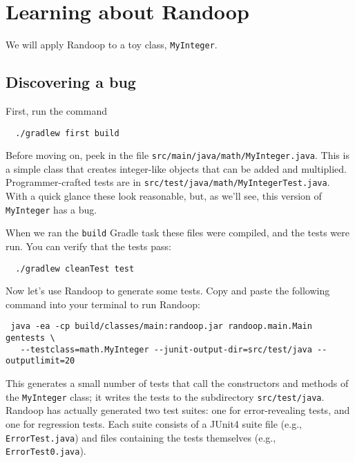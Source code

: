 \documentclass[11pt, oneside]{article} %
\newcommand{\code}[1]{{\texttt{#1}}}
\newcommand{\cmd}[1]{{\texttt{#1}}}
\begin{document}
\section{Learning about Randoop}\label{thebasics}
We will apply Randoop to a toy class, \texttt{MyInteger}.

\subsection{Discovering a bug}
First, run the command
\begin{verbatim}
  ./gradlew first build
\end{verbatim}

Before moving on, peek in the file \texttt{src/main/java/math/MyInteger.java}.
This is a simple class that creates integer-like objects that can be added and multiplied.
Programmer-crafted tests are in \texttt{src/test/java/math/MyIntegerTest.java}.
With a quick glance these look reasonable, but, as we'll see, this version of \code{MyInteger} has a bug.

When we ran the \cmd{build} Gradle task these files were compiled, and the tests were run.
You can verify that the tests pass:
\begin{verbatim}
  ./gradlew cleanTest test
\end{verbatim}

Now let's use Randoop to generate some tests.
Copy and paste the following command into your terminal to run Randoop:
\begin{verbatim}
 java -ea -cp build/classes/main:randoop.jar randoop.main.Main gentests \
   --testclass=math.MyInteger --junit-output-dir=src/test/java --outputlimit=20
\end{verbatim}
This generates a small number of tests that call the constructors and
methods of the \texttt{MyInteger} class; it writes the tests to the subdirectory \texttt{src/test/java}.
Randoop has actually generated two test suites: one for error-revealing tests, and one for regression tests.
Each suite consists of a JUnit4 suite file (e.g., \texttt{ErrorTest.java})
and files containing the tests themselves (e.g., \texttt{ErrorTest0.java}).
\end{document}
